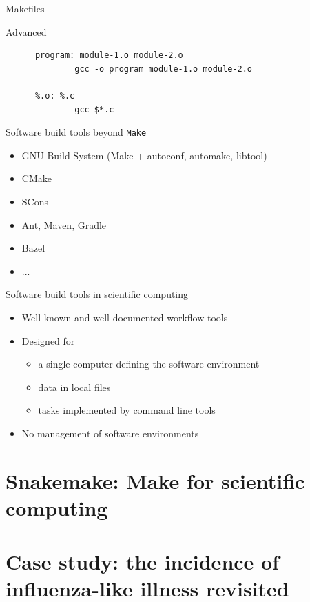 \documentclass[aspectratio=169]{beamer}
\begin{document}
\begin{frame}[fragile]{Makefiles}

  \begin{block}{Advanced}
    \begin{lstlisting}
      program: module-1.o module-2.o
              gcc -o program module-1.o module-2.o

      %.o: %.c
              gcc $*.c
    \end{lstlisting}
  \end{block}

\end{frame}

\begin{frame}{Software build tools beyond \texttt{Make}}

  \begin{itemize}
  \item GNU Build System (Make + autoconf, automake, libtool)
  \item CMake
  \item SCons
  \item Ant, Maven, Gradle
  \item Bazel
  \item ...
  \end{itemize}

\end{frame}

\begin{frame}{Software build tools in scientific computing}

  \begin{itemize}
  \item Well-known and well-documented workflow tools
  \item Designed for
    \begin{itemize}
    \item a single computer defining the software environment
    \item data in local files
    \item tasks implemented by command line tools
    \end{itemize}
  \item No management of software environments
  \end{itemize}

\end{frame}

\section*{Snakemake: Make for scientific computing}

\begin{frame}{}

\end{frame}

\section*{Case study: the incidence of influenza-like illness revisited}

\begin{frame}{}

\end{frame}
\end{document}
